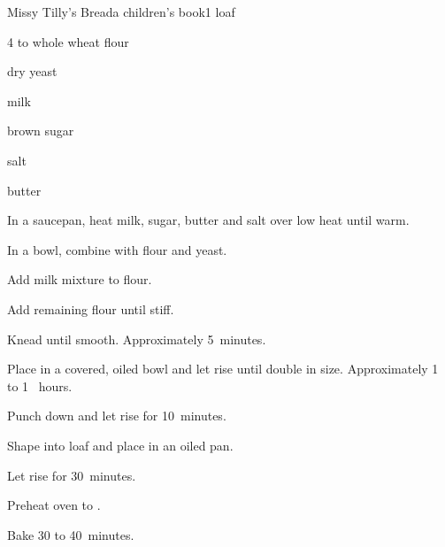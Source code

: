 \begin{recipe}{Missy Tilly's Bread}{a children's book}{1 loaf}

\begin{ingredients}
\item 4 to \C{4\third} whole wheat flour
\item \tp{4\half} dry yeast
\item \C{1\threequarter} milk
\item \C{\half} brown sugar
\item {} salt
\item {} butter
\end{ingredients}

\begin{directions}
\item In a saucepan, heat milk, sugar, butter and salt over low heat until warm.
\item In a bowl, combine with  flour and yeast.
\item Add milk mixture to flour.
\item Add remaining flour until stiff.
\item Knead until smooth. Approximately 5~minutes.
\item Place in a covered, oiled bowl and let rise until double in size. Approximately 1 to 1 \half~hours.
\item Punch down and let rise for 10~minutes.
\item Shape into loaf and place in an oiled pan.
\item Let rise for 30~minutes.
\item Preheat oven to .
\item Bake 30 to 40~minutes.
\end{directions}
\end{recipe}
